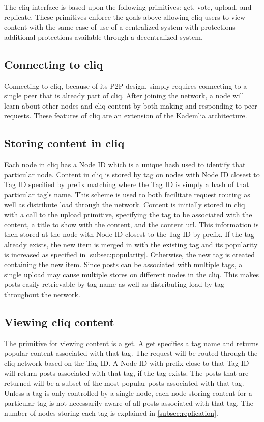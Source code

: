 \documentclass{sig-alternate}
\begin{document}
The cliq interface is based upon the following primitives: get, vote, upload, and replicate. 
These primitives enforce the goals above allowing cliq users to view content with the same ease of use of a centralized system with protections additional protections available through a decentralized system. 

\subsection{Connecting to cliq}

Connecting to cliq, because of its P2P design, simply requires connecting to a single peer that is already part of cliq. 
After joining the network, a node will learn about other nodes and cliq content by both making and responding to peer requests. 
These features of cliq are an extension of the Kademlia architecture.

\subsection{Storing content in cliq}
\label{subsec:upload}

Each node in cliq has a Node ID which is a unique hash used to identify that particular node. 
Content in cliq is stored by tag on nodes with Node ID closest to Tag ID specified by prefix matching where the Tag ID is simply a hash of that particular tag's name. 
This scheme is used to both facilitate request routing as well as distribute load through the network. 
Content is initially stored in cliq with a call to the upload primitive, specifying the tag to be associated with the content, a title to show with the content, and the content url. 
This information is then stored at the node with Node ID closest to the Tag ID by prefix. 
If the tag already exists, the new item is merged in with the existing tag and its popularity is increased as specified in \ref{subsec:popularity}. 
Otherwise, the new tag is created containing the new item. 
Since posts can be associated with multiple tags, a single upload may cause multiple stores on different nodes in the cliq. 
This makes posts easily retrievable by tag name as well as distributing load by tag throughout the network. 

\subsection{Viewing cliq content}

The primitive for viewing content is a get. 
A get specifies a tag name and returns popular content associated with that tag. 
The request will be routed through the cliq network based on the Tag ID. 
A Node ID with prefix close to that Tag ID will return posts associated with that tag, if the tag exists. 
The posts that are returned will be a subset of the most popular posts associated with that tag. 
Unless a tag is only controlled by a single node, each node storing content for a particular tag is not necessarily aware of all posts associated with that tag. 
The number of nodes storing each tag is explained in \ref{subsec:replication}. 
\end{document}

